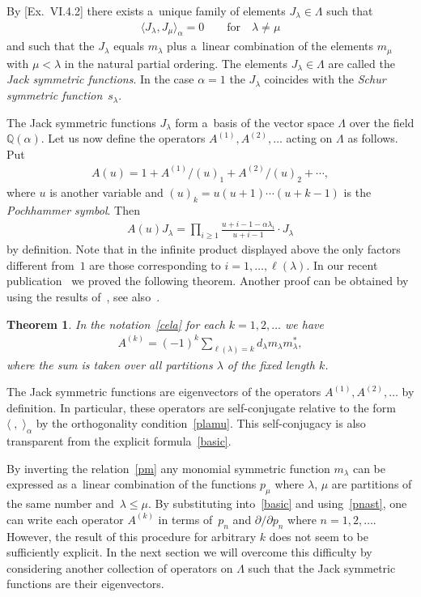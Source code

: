 \documentclass[11pt]{article}
\newtheorem{theorem}{Theorem}
\numberwithin{equation}{section}
\renewcommand\ge{\geqslant}
\renewcommand\le{\leqslant}
\begin{document}
By [Ex.~VI.4.2] there exists a~unique family of elements $J_\lambda\in\Lambda$ such that
\begin{gather}
\label{plamu}
\langle J_\lambda,J_\mu\rangle_\alpha=0
\qquad
\text{for}
\quad
\lambda\neq\mu
\end{gather}
and such that the $J_\lambda$ equals $m_\lambda$ plus a~linear combination of the elements $m_\mu$ with
$\mu<\lambda$ in the natural partial ordering.
The elements $J_\lambda\in\Lambda$ are called the \textit{Jack symmetric functions}.
In the case $\alpha=1$ the $J_\lambda$ coincides with the \emph{Schur symmetric function}~$s_\lambda$.

The Jack symmetric functions $J_\lambda$ form a~basis of the vector space $\Lambda$ over the f\/ield
$\mathbb Q(\alpha)$.
Let us now def\/ine the operators $A^{(1)},A^{(2)},\ldots$ acting on
$\Lambda$ as follows.
Put
\begin{gather}
\label{au}
A(u)=1+A^{(1)}/(u)_1+A^{(2)}/(u)_2+\cdots,
\end{gather}
where $u$ is another variable and $(u)_k=u(u+1)\cdots(u+k-1)$ is the \emph{Pochhammer symbol}.
Then
\begin{gather}
\label{ajack}
A(u)J_\lambda=\prod_{i\ge1}\frac{u+i-1-\alpha\lambda_i}{u+i-1}\cdot J_\lambda
\end{gather}
by def\/inition.
Note that in the inf\/inite product displayed above the only factors dif\/ferent from~$1$ are those
corresponding to $i=1,\ldots,\ell(\lambda)$.
In our recent publication~\cite{NS1} we proved the following theorem.
Another proof can be obtained by using the results of~\cite{Shi}, see also~\cite{NS2}.
\begin{theorem}\label{Theorem1}
In the notation~\eqref{cela} for each $k=1,2,\ldots$ we have
\begin{gather}
\label{basic}
A^{(k)}=(-1)^k\sum_{\ell(\lambda)=k}d_\lambda m_\lambda m_\lambda^{\ast},
\end{gather}
where the sum is taken over all partitions $\lambda$ of the fixed length $k$.
\end{theorem}

The Jack symmetric functions are eigenvectors of the operators
$A^{(1)},A^{(2)},\ldots$ by def\/inition.
In particular, these operators are self-conjugate relative to the form $\langle\;,\;\rangle_\alpha$ by the
orthogonality condition~\eqref{plamu}.
This self-conjugacy is also transparent from the explicit formula~\eqref{basic}.

By inverting the relation~\eqref{pm} any monomial symmetric function $m_\lambda$ can be expressed as
a~linear combination of the functions $p_\mu$ where $\lambda$, $\mu$ are partitions of the same number and~$\lambda\le\mu$.
By substituting into~\eqref{basic} and using~\eqref{pnast}, one can write each operator
$A^{(k)}$ in terms of~$p_n$ and $\partial /\partial  p_{n}$ where $n=1,2,\ldots$.
However, the result of this procedure for arbitrary $k$ does not seem to be suf\/f\/iciently explicit.
In the next section we will overcome this dif\/f\/iculty by considering another collection of operators on
$\Lambda$ such that the Jack symmetric functions are their eigenvectors.
\end{document}
